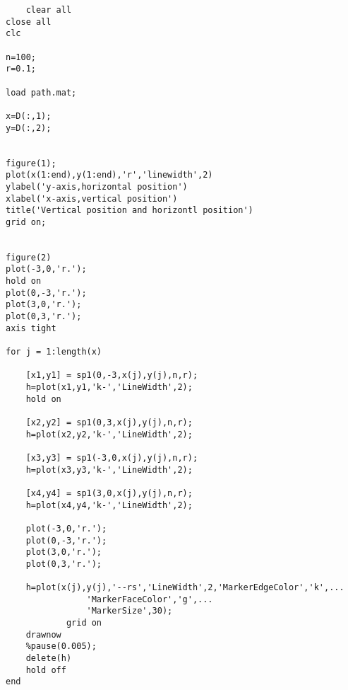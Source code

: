 \begin{framed}
\begin{verbatim}
    clear all
close all
clc

n=100;
r=0.1;

load path.mat;

x=D(:,1);
y=D(:,2);


figure(1);
plot(x(1:end),y(1:end),'r','linewidth',2)
ylabel('y-axis,horizontal position')
xlabel('x-axis,vertical position')
title('Vertical position and horizontl position')
grid on;


figure(2)
plot(-3,0,'r.');
hold on 
plot(0,-3,'r.');
plot(3,0,'r.');
plot(0,3,'r.');
axis tight

for j = 1:length(x)
    
    [x1,y1] = sp1(0,-3,x(j),y(j),n,r);
    h=plot(x1,y1,'k-','LineWidth',2);
    hold on
    
    [x2,y2] = sp1(0,3,x(j),y(j),n,r);
    h=plot(x2,y2,'k-','LineWidth',2);
    
    [x3,y3] = sp1(-3,0,x(j),y(j),n,r);
    h=plot(x3,y3,'k-','LineWidth',2);
    
    [x4,y4] = sp1(3,0,x(j),y(j),n,r);
    h=plot(x4,y4,'k-','LineWidth',2);
    
    plot(-3,0,'r.');
    plot(0,-3,'r.');
    plot(3,0,'r.');
    plot(0,3,'r.');
    
    h=plot(x(j),y(j),'--rs','LineWidth',2,'MarkerEdgeColor','k',...
                'MarkerFaceColor','g',...
                'MarkerSize',30);
            grid on
	drawnow
    %pause(0.005);
	delete(h)
	hold off
end

    
\end{verbatim}
\end{framed}




























